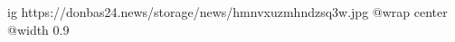  
 
 
 
 

\ifcmt
  ig https://donbas24.news/storage/news/hmnvxuzmhndzsq3w.jpg
  @wrap center
  @width 0.9
\fi
